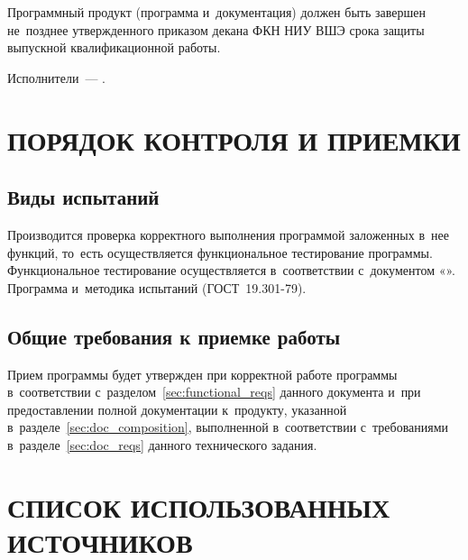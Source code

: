 \documentclass[12pt,a4paper]{extarticle}
\begin{document}
Программный продукт (программа и~документация) должен быть завершен не~позднее утвержденного приказом декана ФКН НИУ ВШЭ срока защиты выпускной квалификационной работы.

Исполнители~--- \hseAuthorsList.

\clearpage

\section{ПОРЯДОК КОНТРОЛЯ И ПРИЕМКИ}

\subsection{Виды испытаний}

Производится проверка корректного выполнения программой заложенных в~нее функций, то~есть осуществляется функциональное тестирование программы. Функциональное тестирование осуществляется в~соответствии с~документом «\projectname». Программа и~методика испытаний (ГОСТ~19.301-79).

\subsection{Общие требования к приемке работы}

Прием программы будет утвержден при корректной работе программы в~соответствии с~разделом~\ref{sec:functional_reqs} данного документа и~при предоставлении полной документации к~продукту, указанной в~разделе~\ref{sec:doc_composition}, выполненной в~соответствии с~требованиями в~разделе~\ref{sec:doc_reqs} данного технического задания.

\clearpage
\pagestyle{appendix}

\section*{СПИСОК ИСПОЛЬЗОВАННЫХ ИСТОЧНИКОВ}
\end{document}
